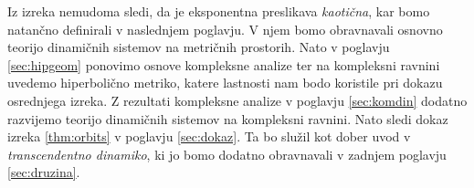 \noindent Iz izreka nemudoma sledi, da je eksponentna preslikava \emph{kaotična}, kar bomo natančno definirali v naslednjem poglavju. V njem bomo obravnavali osnovno teorijo dinamičnih sistemov na metričnih prostorih. Nato v poglavju \ref{sec:hipgeom} ponovimo osnove kompleksne analize ter na kompleksni ravnini uvedemo hiperbolično metriko, katere lastnosti nam bodo koristile pri dokazu osrednjega izreka. Z rezultati kompleksne analize v poglavju \ref{sec:komdin} dodatno razvijemo teorijo dinamičnih sistemov na kompleksni ravnini. Nato sledi dokaz izreka \ref{thm:orbits} v poglavju \ref{sec:dokaz}. Ta bo služil kot dober uvod v \emph{transcendentno dinamiko}, ki jo bomo dodatno obravnavali v zadnjem poglavju \ref{sec:druzina}.

